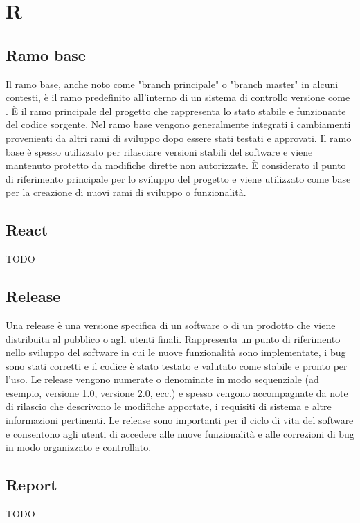 \section{R}

\vspace{2em}
\subsection*{Ramo base}
Il ramo base, anche noto come "branch principale" o "branch master" in alcuni contesti, è il ramo predefinito all'interno di un sistema di controllo versione come . È il ramo principale del progetto che rappresenta lo stato stabile e funzionante del codice sorgente. Nel ramo base vengono generalmente integrati i cambiamenti provenienti da altri rami di sviluppo dopo essere stati testati e approvati. Il ramo base è spesso utilizzato per rilasciare versioni stabili del software e viene mantenuto protetto da modifiche dirette non autorizzate. È considerato il punto di riferimento principale per lo sviluppo del progetto e viene utilizzato come base per la creazione di nuovi rami di sviluppo o funzionalità.

\vspace{2em}
\subsection*{React}
TODO

\vspace{2em}
\subsection*{Release}
Una release è una versione specifica di un software o di un prodotto che viene distribuita al pubblico o agli utenti finali. Rappresenta un punto di riferimento nello sviluppo del software in cui le nuove funzionalità sono implementate, i bug sono stati corretti e il codice è stato testato e valutato come stabile e pronto per l'uso. Le release vengono numerate o denominate in modo sequenziale (ad esempio, versione 1.0, versione 2.0, ecc.) e spesso vengono accompagnate da note di rilascio che descrivono le modifiche apportate, i requisiti di sistema e altre informazioni pertinenti. Le release sono importanti per il ciclo di vita del software e consentono agli utenti di accedere alle nuove funzionalità e alle correzioni di bug in modo organizzato e controllato.

\vspace{2em}
\subsection*{Report}
TODO

